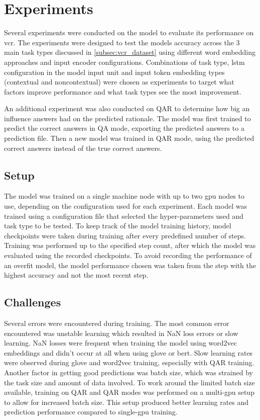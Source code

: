 \chapter{Experiments}
\label{chp:experiments}

Several experiments were conducted on the model to evaluate its performance on \gls{vcr}.
The experiments were designed to test the models accuracy across the 3 main task types discussed in \ref{subsec:vcr_dataset} using different word embedding approaches and input encoder configurations.
Combinations of task type, \gls{lstm} configuration in the model input unit and input token embedding types (contextual and noncontextual) were chosen as experiments to target what factors improve performance and what task types see the most improvement.

An additional experiment was also conducted on QA\rightarrow{}R to determine how big an influence answers had on the predicted rationale.
The model was first trained to predict the correct answers in Q\rightarrow{}A mode, exporting the predicted answers to a prediction file.
Then a new model was trained in QA\rightarrow{}R mode, using the predicted correct answers instead of the true correct answers.

\section{Setup}
\label{sec:experiment-setup}

The model was trained on a single machine node with up to two \acrshort{gpu} nodes to use, depending on the configuration used for each experiment.
Each model was trained using a configuration file that selected the hyper-parameters used and task type to be tested.
To keep track of the model training history, model checkpoints were taken during training after every predefined number of steps.
Training was performed up to the specified step count, after which the model was evaluated using the recorded checkpoints.
To avoid recording the performance of an overfit model, the model performance chosen was taken from the step with the highest accuracy and not the most recent step.

\section{Challenges}
\label{sec:experiment-challenges}

Several errors were encountered during training.
The most common error encountered was unstable learning which resulted in NaN loss errors or slow learning.
NaN losses were frequent when training the model using word2vec embeddings and didn't occur at all when using glove or bert.
Slow learning rates were observed during glove and word2vec training, especially with Q\rightarrow{}AR training.
Another factor in getting good predictions was batch size, which was strained by the task size and amount of data involved.
To work around the limited batch size available, training on QA\rightarrow{}R and Q\rightarrow{}AR modes was performed on a multi-gpu setup to allow for increased batch size.
This setup produced better learning rates and prediction performance compared to single-gpu training.

